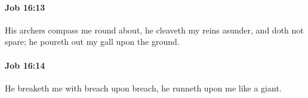 		\paragraph{Job 16:13} %
			\label{JOB-16-13}

			His archers compass me round about, he cleaveth my reins asunder, and doth not spare; he poureth out my gall upon the ground.


		\paragraph{Job 16:14} %
			\label{JOB-16-14}

			He breaketh me with breach upon breach, he runneth upon me like a giant.


